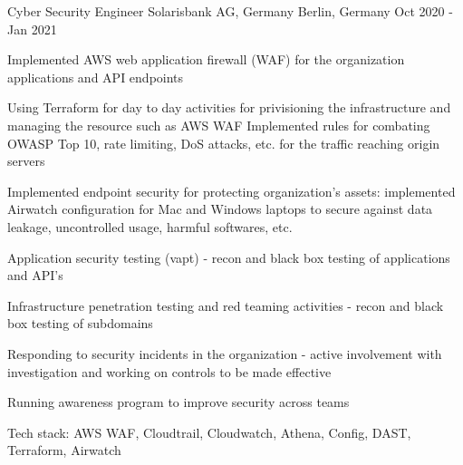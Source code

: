 \begin{cventries}
\cventry
    {Cyber Security Engineer} %
    {Solarisbank AG, Germany} %
    {Berlin, Germany} %
    {Oct 2020 - Jan 2021} %
    {
      \begin{cvitems} %
        \item {Implemented AWS web application firewall (WAF) for the organization applications and API endpoints
        \item Using Terraform for day to day activities for privisioning the infrastructure and managing the resource such as AWS WAF Implemented rules for combating OWASP Top 10, rate limiting, DoS attacks, etc. for the traffic reaching origin servers}
        \item {Implemented endpoint security for protecting organization's assets: implemented Airwatch configuration for Mac and Windows laptops to secure against data leakage, uncontrolled usage, harmful softwares, etc.}
        \item {Application security testing (vapt) - recon and black box testing of applications and API's}
        \item {Infrastructure penetration testing and red teaming activities  - recon and black box testing of subdomains}
        \item {Responding to security incidents in the organization - active involvement with investigation and working on controls to be made effective}
        \item {Running awareness program to improve security across teams}
        \item {Tech stack: AWS WAF, Cloudtrail, Cloudwatch, Athena, Config, DAST, Terraform, Airwatch}
      \end{cvitems}
    }


\end{cventries}
